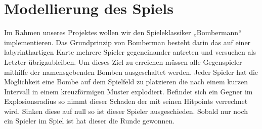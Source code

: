 \documentclass[10pt, a4paper]{report}
\begin{document}
	\section{Modellierung des Spiels}
	Im Rahmen unseres Projektes wollen wir den Spieleklassiker „Bombermann“ implementieren. Das Grundprinzip von Bomberman besteht darin das auf einer labyrinthartigen Karte mehrere Spieler gegeneinander antreten und versuchen als Letzter übrigzubleiben. Um dieses Ziel zu erreichen müssen alle Gegenspieler mithilfe der namensgebenden Bomben ausgeschaltet werden. Jeder Spieler hat die Möglichkeit eine Bombe auf dem Spielfeld zu platzieren die nach einem kurzen Intervall in einem kreuzförmigen Muster explodiert. Befindet sich ein Gegner im Explosionsradius so nimmt dieser Schaden der mit seinen Hitpoints verrechnet wird. Sinken diese auf null so ist dieser Spieler ausgeschieden. Sobald nur noch ein Spieler im Spiel ist hat dieser die Runde gewonnen.
\end{document}
